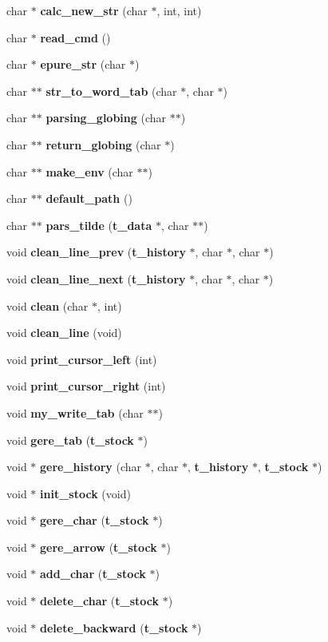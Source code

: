 \begin{DoxyCompactItemize}
\item 
char $\ast$ {\bf calc\-\_\-new\-\_\-str} (char $\ast$, int, int)
\item 
char $\ast$ {\bf read\-\_\-cmd} ()
\item 
char $\ast$ {\bf epure\-\_\-str} (char $\ast$)
\item 
char $\ast$$\ast$ {\bf str\-\_\-to\-\_\-word\-\_\-tab} (char $\ast$, char $\ast$)
\item 
char $\ast$$\ast$ {\bf parsing\-\_\-globing} (char $\ast$$\ast$)
\item 
char $\ast$$\ast$ {\bf return\-\_\-globing} (char $\ast$)
\item 
char $\ast$$\ast$ {\bf make\-\_\-env} (char $\ast$$\ast$)
\item 
char $\ast$$\ast$ {\bf default\-\_\-path} ()
\item 
char $\ast$$\ast$ {\bf pars\-\_\-tilde} ({\bf t\-\_\-data} $\ast$, char $\ast$$\ast$)
\item 
void {\bf clean\-\_\-line\-\_\-prev} ({\bf t\-\_\-history} $\ast$, char $\ast$, char $\ast$)
\item 
void {\bf clean\-\_\-line\-\_\-next} ({\bf t\-\_\-history} $\ast$, char $\ast$, char $\ast$)
\item 
void {\bf clean} (char $\ast$, int)
\item 
void {\bf clean\-\_\-line} (void)
\item 
void {\bf print\-\_\-cursor\-\_\-left} (int)
\item 
void {\bf print\-\_\-cursor\-\_\-right} (int)
\item 
void {\bf my\-\_\-write\-\_\-tab} (char $\ast$$\ast$)
\item 
void {\bf gere\-\_\-tab} ({\bf t\-\_\-stock} $\ast$)
\item 
void $\ast$ {\bf gere\-\_\-history} (char $\ast$, char $\ast$, {\bf t\-\_\-history} $\ast$, {\bf t\-\_\-stock} $\ast$)
\item 
void $\ast$ {\bf init\-\_\-stock} (void)
\item 
void $\ast$ {\bf gere\-\_\-char} ({\bf t\-\_\-stock} $\ast$)
\item 
void $\ast$ {\bf gere\-\_\-arrow} ({\bf t\-\_\-stock} $\ast$)
\item 
void $\ast$ {\bf add\-\_\-char} ({\bf t\-\_\-stock} $\ast$)
\item 
void $\ast$ {\bf delete\-\_\-char} ({\bf t\-\_\-stock} $\ast$)
\item 
void $\ast$ {\bf delete\-\_\-backward} ({\bf t\-\_\-stock} $\ast$)
\end{DoxyCompactItemize}
